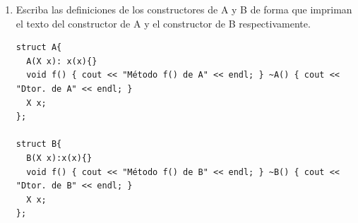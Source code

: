 \begin{enumerate}[label = \alph*)]
  \item Escriba las definiciones de los constructores de A y B de forma que impriman el texto del constructor de A y el constructor de B respectivamente.
  
\begin{verbatim}
struct A{
  A(X x): x(x){}
  void f() { cout << "Método f() de A" << endl; } ~A() { cout << "Dtor. de A" << endl; }
  X x;
};

struct B{
  B(X x):x(x){}
  void f() { cout << "Método f() de B" << endl; } ~B() { cout << "Dtor. de B" << endl; }
  X x;
};
\end{verbatim}
\end{enumerate}